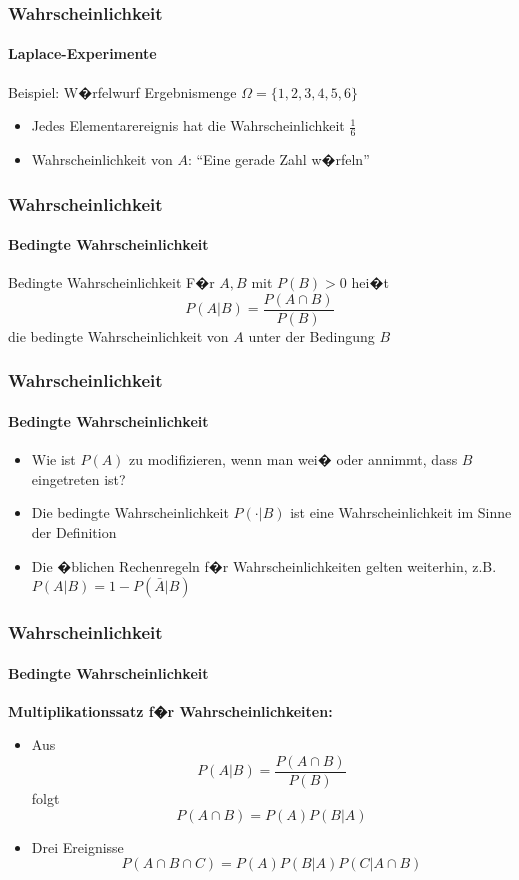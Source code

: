 \documentclass[12pt,show notes]{beamer}
\begin{document}
\begin{frame}
\frametitle{Wahrscheinlichkeit}
\framesubtitle{Laplace-Experimente}
\begin{exampleblock}{Beispiel: W�rfelwurf}
Ergebnismenge $\Omega =\{1,2,3,4,5,6\}$\medskip
\begin{itemize}
\item Jedes Elementarereignis hat die Wahrscheinlichkeit $\frac{1}{6}$
\item Wahrscheinlichkeit von $A$: "`Eine gerade Zahl w�rfeln"'
\end{itemize}
\end{exampleblock}
\end{frame}

\begin{frame}
\frametitle{Wahrscheinlichkeit}
\framesubtitle{Bedingte Wahrscheinlichkeit}
\begin{block}{Bedingte Wahrscheinlichkeit}
F�r $A,B$ mit $P(B)>0$ hei�t
\[ P(A|B)=\frac{P(A\cap B)}{P(B)} \]
die bedingte Wahrscheinlichkeit von $A$ unter der Bedingung $B$
\end{block}
\end{frame}

\begin{frame}
\frametitle{Wahrscheinlichkeit}
\framesubtitle{Bedingte Wahrscheinlichkeit}
\begin{itemize}
\item Wie ist $P(A)$ zu modifizieren, wenn man wei� oder annimmt, dass $B$ eingetreten ist?
\item Die bedingte Wahrscheinlichkeit $P(\cdot|B)$ ist eine Wahrscheinlichkeit im Sinne der Definition
\item Die �blichen Rechenregeln f�r Wahrscheinlichkeiten gelten weiterhin,
z.B.\ $P(A|B)=1-P(\bar A|B)$
\end{itemize}
\end{frame}

\begin{frame}
\frametitle{Wahrscheinlichkeit}
\framesubtitle{Bedingte Wahrscheinlichkeit}
\textbf{Multiplikationssatz f�r Wahrscheinlichkeiten:}\medskip
\begin{itemize}
\item Aus
\[ P(A|B)=\frac{P(A\cap B)}{P(B)} \]
folgt
\[ P(A\cap B)=P(A)P(B|A) \]
\item Drei Ereignisse
\[ P(A\cap B\cap C)=P(A)P(B|A)P(C|A\cap B) \]
\end{itemize}
\end{frame}
\end{document}
